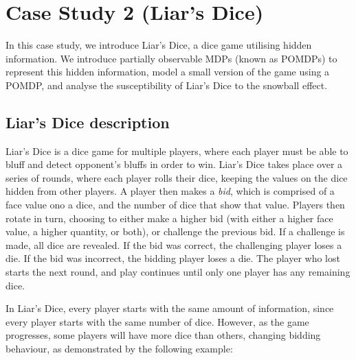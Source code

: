 \chapter{Case Study 2 (Liar's Dice)}

In this case study, we introduce Liar's Dice, a dice game utilising hidden information. We introduce partially observable MDPs (known as POMDPs) to represent this hidden information, model a small version of the game using a POMDP, and analyse the susceptibility of Liar's Dice to the snowball effect.

\section{Liar's Dice description}
Liar's Dice is a dice game for multiple players, where each player must be able to bluff and detect opponent's bluffs in order to win. Liar's Dice takes place over a series of rounds, where each player rolls their dice, keeping the values on the dice hidden from other players. A player then makes a \emph{bid}, which is comprised of a face value ono a dice, and the number of dice that show that value. Players then rotate in turn, choosing to either make a higher bid (with either a higher face value, a higher quantity, or both), or challenge the previous bid. If a challenge is made, all dice are revealed. If the bid was correct, the challenging player loses a die. If the bid was incorrect, the bidding player loses a die. The player who lost starts the next round, and play continues until only one player has any remaining dice.

In Liar's Dice, every player starts with the same amount of information, since every player starts with the same number of dice. However, as the game progresses, some players will have more dice than others, changing bidding behaviour, as demonstrated by the following example:

